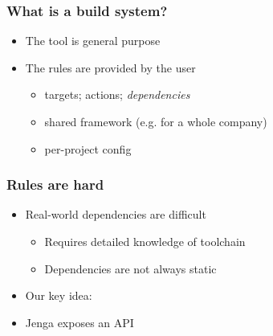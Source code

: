 \documentclass{beamer}
\begin{document}
\begin{frame}[fragile]
\frametitle{What is a build system?}
\begin{center}
\end{center}
\begin{itemize}
\item The tool is general purpose
\item The rules are provided by the user
\begin{itemize}
\item targets; actions; {\em dependencies}
\item shared framework (e.g. for a whole company)
\item per-project config
\end{itemize}
\end{itemize}
\end{frame}

%


%


\begin{frame}[fragile]
\frametitle{Rules are hard}
\begin{itemize}
\item Real-world dependencies are difficult
\begin{itemize}
\item Requires detailed knowledge of toolchain
\item Dependencies are not always static
\end{itemize}
\item Our key idea:
\begin{center}
\end{center}
\item Jenga exposes an API
\end{itemize}
\end{frame}
\end{document}
